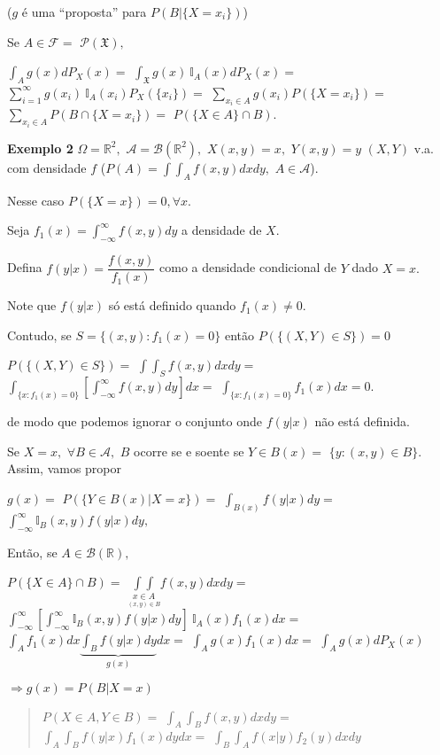 \documentclass[
]{book}
\begin{document}
(\(g\) é uma ``proposta'' para \(P(B|\{X=x_i\})\))

Se \(A \in \mathcal{F}=\) \(\mathcal{P}(\mathfrak{X}),\)

\(\int_A g(x)dP_X(x)=\) \(\int_{\mathfrak{X}}g(x)~\mathbb{I}_A(x)dP_X(x)=\) \(\sum_{i=1}^\infty g(x_i)~\mathbb{I}_A(x_i)P_X(\{x_i\})=\) \(\sum_{x_i \in A}g(x_i)P(\{X=x_i\})=\) \(\sum_{x_i \in A}P(B \cap \{X=x_i\})=\) \(P(\{X\in A\}\cap B).\)

\textbf{Exemplo 2} \(\Omega=\mathbb{R}^2,\) \(\mathcal{A}= \mathcal{B}(\mathbb{R}^2),\) \(X(x,y)=x,\) \(Y(x,y)=y\) \((X,Y)\) v.a. com densidade \(f\) (\(P(A)=\int \int_A f(x,y)dxdy,\) \(A \in \mathcal{A}\)).

Nesse caso \(P(\{X=x\})=0, \forall x.\)

Seja \(f_1(x)=\int_{-\infty}^{\infty} f(x,y)dy\) a densidade de \(X\).

Defina \(f(y|x)=\dfrac{f(x,y)}{f_1(x)}\) como a densidade condicional de \(Y\) dado \(X=x.\)

Note que \(f(y|x)\) só está definido quando \(f_1(x) \neq 0.\)

Contudo, se \(S=\{(x,y): f_1(x)=0\}\) então \(P(\{(X,Y)\in S\})=0\)

\(P(\{(X,Y)\in S\})=\) \(\int \int_S f(x,y)dxdy=\) \(\int_{\{x:f_1(x)=0\}}\left[\int_{-\infty}^\infty f(x,y)dy\right]dx=\) \(\int_{\{x:f_1(x)=0\}} f_1(x)dx=0.\)

de modo que podemos ignorar o conjunto onde \(f(y|x)\) não está definida.

Se \(X=x,\) \(\forall B \in \mathcal{A},\) \(B\) ocorre se e soente se \(Y \in B(x)=\) \(\{y:(x,y) \in B\}.\) Assim, vamos propor

\(g(x)=\) \(P(\{Y \in B(x)|X=x\})=\) \(\int_{B(x)}f(y|x)dy=\) \(\int_{-\infty}^\infty \mathbb{I}_B(x,y)f(y|x)dy,\)

Então, se \(A \in \mathcal{B}(\mathbb{R}),\)

\(P(\{X \in A\}\cap B)=\) \(\underset{\underset{(x,y)\in B}{x\in A}}{\int \int}f(x,y)dxdy=\) \(\int_{-\infty}^{\infty}\left[\int_{-\infty}^{\infty}\mathbb{I}_B(x,y)f(y|x)dy\right]~\mathbb{I}_A(x)f_1(x)dx=\) \(\int_Af_1(x)dx\underbrace{\int_Bf(y|x)dy}_{g(x)}dx=\) \(\int_Ag(x)f_1(x)dx=\) \(\int_Ag(x)dP_X(x)\)

\(\Rightarrow g(x)=P(B|X=x)\)

\begin{quote}
\(P(X\in A,Y \in B)=\) \(\int_A \int_Bf(x,y)dxdy=\) \(\int_A \int_Bf(y|x)f_1(x)dydx=\) \(\int_B \int_Af(x|y)f_2(y)dxdy\)
\end{quote}

  
\end{document}
